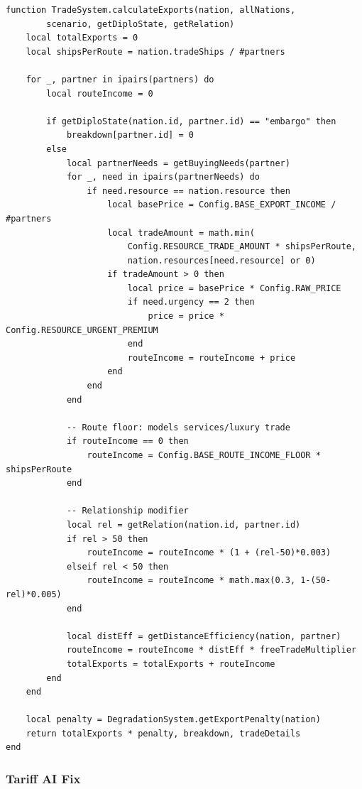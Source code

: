 \documentclass[12pt,a4paper]{article}
\begin{document}
\begin{lstlisting}[caption={Export calculation core --- TradeSystem.lua}]
function TradeSystem.calculateExports(nation, allNations,
        scenario, getDiploState, getRelation)
    local totalExports = 0
    local shipsPerRoute = nation.tradeShips / #partners

    for _, partner in ipairs(partners) do
        local routeIncome = 0

        if getDiploState(nation.id, partner.id) == "embargo" then
            breakdown[partner.id] = 0
        else
            local partnerNeeds = getBuyingNeeds(partner)
            for _, need in ipairs(partnerNeeds) do
                if need.resource == nation.resource then
                    local basePrice = Config.BASE_EXPORT_INCOME / #partners
                    local tradeAmount = math.min(
                        Config.RESOURCE_TRADE_AMOUNT * shipsPerRoute,
                        nation.resources[need.resource] or 0)
                    if tradeAmount > 0 then
                        local price = basePrice * Config.RAW_PRICE
                        if need.urgency == 2 then
                            price = price * Config.RESOURCE_URGENT_PREMIUM
                        end
                        routeIncome = routeIncome + price
                    end
                end
            end

            -- Route floor: models services/luxury trade
            if routeIncome == 0 then
                routeIncome = Config.BASE_ROUTE_INCOME_FLOOR * shipsPerRoute
            end

            -- Relationship modifier
            local rel = getRelation(nation.id, partner.id)
            if rel > 50 then
                routeIncome = routeIncome * (1 + (rel-50)*0.003)
            elseif rel < 50 then
                routeIncome = routeIncome * math.max(0.3, 1-(50-rel)*0.005)
            end

            local distEff = getDistanceEfficiency(nation, partner)
            routeIncome = routeIncome * distEff * freeTradeMultiplier
            totalExports = totalExports + routeIncome
        end
    end

    local penalty = DegradationSystem.getExportPenalty(nation)
    return totalExports * penalty, breakdown, tradeDetails
end
\end{lstlisting}

\subsubsection{Tariff AI Fix}
\end{document}
